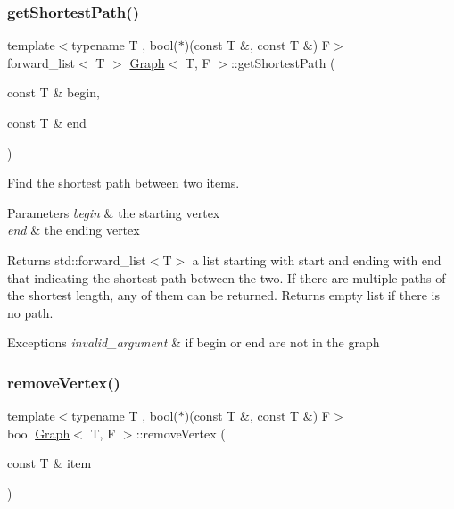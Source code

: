\subsubsection{\texorpdfstring{get\+Shortest\+Path()}{getShortestPath()}}
{\footnotesize\ttfamily template$<$typename T , bool($\ast$)(const T \&, const T \&) F$>$ \\
forward\+\_\+list$<$ T $>$ \hyperlink{class_graph}{Graph}$<$ T, F $>$\+::get\+Shortest\+Path (\begin{DoxyParamCaption}\item[{const T \&}]{begin,  }\item[{const T \&}]{end }\end{DoxyParamCaption})}



Find the shortest path between two items. 


\begin{DoxyParams}{Parameters}
{\em begin} & the starting vertex \\
\hline
{\em end} & the ending vertex \\
\hline
\end{DoxyParams}
\begin{DoxyReturn}{Returns}
std\+::forward\+\_\+list$<$\+T$>$ a list starting with start and ending with end that indicating the shortest path between the two. If there are multiple paths of the shortest length, any of them can be returned. Returns empty list if there is no path. 
\end{DoxyReturn}

\begin{DoxyExceptions}{Exceptions}
{\em invalid\+\_\+argument} & if begin or end are not in the graph \\
\hline
\end{DoxyExceptions}
\mbox{\label{class_graph_ab60cdf74dfbd8c7682b760338fb8a952}} 
\subsubsection{\texorpdfstring{remove\+Vertex()}{removeVertex()}}
{\footnotesize\ttfamily template$<$typename T , bool($\ast$)(const T \&, const T \&) F$>$ \\
bool \hyperlink{class_graph}{Graph}$<$ T, F $>$\+::remove\+Vertex (\begin{DoxyParamCaption}\item[{const T \&}]{item }\end{DoxyParamCaption})}



